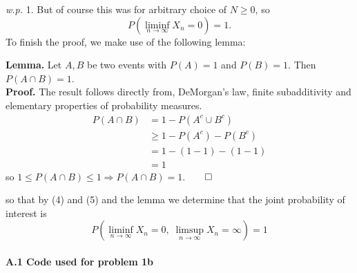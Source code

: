 \documentclass[11pt, letterpaper]{article}
\begin{document}
    {\it w.p.} 1. But of course this was for arbitrary choice of $N\geq 0$, so
    \[P(\liminf_{n\rightarrow\infty}X_n=0)=1.\tag{5}\]
    To finish the proof, we make use of the following lemma:
    \begin{center}
        \begin{minipage}[c]{0.85\linewidth}
            {\bf Lemma.} Let $A,B$ be two events with $P(A)=1$ and $P(B)=1$. Then $P(A\cap B)=1$.\\[10pt]
            {\bf Proof.} The result follows directly from, DeMorgan's law, finite subadditivity and elementary properties of probability measures.
            \begin{align*}
                P(A\cap B)&=1-P(A^c\cup B^c)\tag{DeMorgan's law}\\
                &\geq1-P(A^c)-P(B^c)\tag{finite subadditivity}\\
                &=1-(1-1)-(1-1)\\
                &=1
            \end{align*}
            so $1\leq P(A\cap B)\leq 1\Rightarrow P(A\cap B)=1$.\hfill{$\qed$}
        \end{minipage}\vspace{10pt}
    \end{center}
    so that by (4) and (5) and the lemma we determine that the joint probability of interest is
    \[P(\liminf_{n\rightarrow\infty}X_n=0,\;\limsup_{n\rightarrow\infty}X_n=\infty)=1\tag*{$\qed$}\]
    \\[10pt]
    {\bf A.1 Code used for problem 1b}
\end{document}
